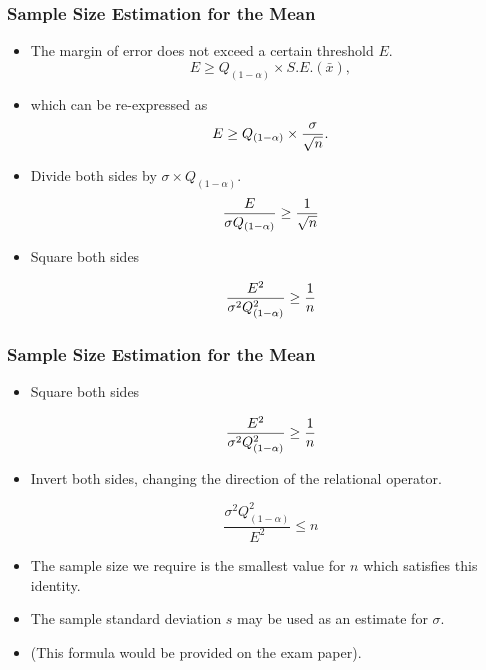 \documentclass[a4]{beamer}
\begin{document}
\begin{frame}
\frametitle{Sample Size Estimation for the Mean}

\begin{itemize}

\item The margin of error does not exceed a certain threshold $E$.
\[ E \geq Q_{(1-\alpha)} \times S.E.(\bar{x}), \]

\item which can be re-expressed as
\[E \geq Q_{(1-\alpha)} \times {\sigma \over \sqrt{n} }.\]

\item Divide both sides by $\sigma \times Q_{(1-\alpha)}$.
\[ \frac{E}{\sigma Q_{(1-\alpha)}} \geq {1 \over \sqrt{n} } \]

\item Square both sides

\[ \frac{E^2}{\sigma^2 Q_{(1-\alpha)}^2} \geq {1 \over n } \]


\end{itemize}
\end{frame}
\begin{frame}
\frametitle{Sample Size Estimation for the Mean}

\begin{itemize}
\item Square both sides

\[ \frac{E^2}{\sigma^2 Q^2_{(1-\alpha)}} \geq {1 \over n } \]

\item Invert both sides, changing the direction of the relational operator.

\[ \frac{\sigma^2 Q^2_{(1-\alpha)}}{E^2} \leq n \]


\item The sample size we require is the smallest value for $n$ which satisfies this identity.
\item The sample standard deviation $s$ may be used as an estimate for $\sigma$.
\item (This formula would be provided on the exam paper).
\end{itemize}


\end{frame}
\end{document}
